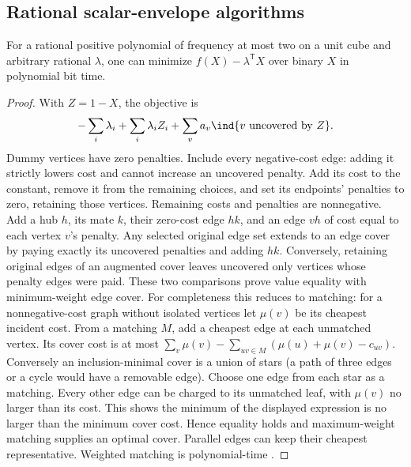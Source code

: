 \subsection{Rational scalar-envelope algorithms}
\begin{proposition}\label{prop:edge-cover-oracle}
For a rational positive polynomial of frequency at most two on a unit
cube and arbitrary rational $\lambda$, one can minimize
$f(X)-\lambda^{\mathsf T}X$ over binary $X$ in polynomial bit time.
\end{proposition}
\begin{proof}
With $Z=1-X$, the objective is
\[
 -\sum_i\lambda_i+\sum_i\lambda_iZ_i+
                     \sum_v a_v\ind\{v\text{ uncovered by }Z\}.
\]
Dummy vertices have zero penalties. Include every negative-cost edge:
adding it strictly lowers cost and cannot increase an uncovered penalty.
Add its cost to the constant, remove it from the remaining choices, and
set its endpoints' penalties to zero, retaining those vertices. Remaining
costs and penalties are nonnegative. Add a hub $h$, its mate $k$, their
zero-cost edge $hk$, and an edge $vh$ of cost equal to each vertex $v$'s
penalty. Any selected original edge set extends to an edge cover by
paying exactly its uncovered penalties and adding $hk$. Conversely,
retaining original edges of an augmented cover leaves uncovered only
vertices whose penalty edges were paid. These two comparisons prove
value equality with minimum-weight edge cover.
For completeness this reduces to matching: for a nonnegative-cost graph
without isolated vertices let $\mu(v)$ be its cheapest incident cost.
From a matching $M$, add a cheapest edge at each unmatched vertex. Its
cover cost is at most
$\sum_v\mu(v)-\sum_{uv\in M}(\mu(u)+\mu(v)-c_{uv})$.
Conversely an inclusion-minimal cover is a union of stars (a path of
three edges or a cycle would have a removable edge). Choose one edge
from each star as a matching. Every other edge can be charged to its
unmatched leaf, with $\mu(v)$ no larger than its cost. This shows the
minimum of the displayed expression is no larger than the minimum cover
cost. Hence equality holds and maximum-weight matching supplies an
optimal cover. Parallel edges can keep their cheapest representative.
Weighted matching is polynomial-time \citep{Edmonds1965}.
\end{proof}

